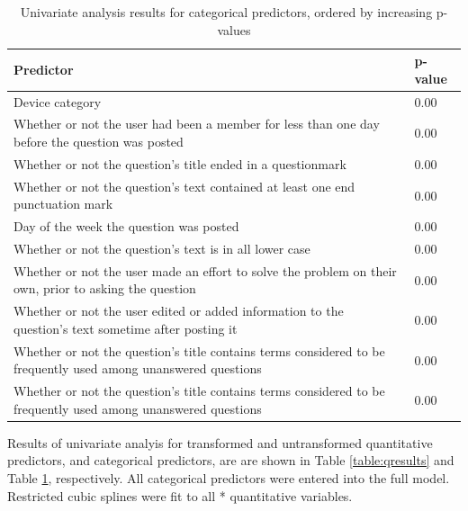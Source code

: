 \documentclass{article}
\begin{document}
\begin{table}[ht]
\centering
\caption{Univariate analysis results for categorical predictors, ordered by increasing p-values} 
\begin{tabular}{|p{12cm}|p{2cm}|}
  \hline
 Predictor & p-value \\ 
  \hline \hline
  Device category & 0.00 \\
  \hline
  Whether or not the user had been a member for less than one day before the question was posted & 0.00 \\ 
  \hline
  Whether or not the question's title ended in a questionmark & 0.00 \\ 
  \hline
  Whether or not the question's text contained at least one end punctuation mark & 0.00 \\ 
  \hline
  Day of the week the question was posted & 0.00 \\ 
  \hline
  Whether or not the question's text is in all lower case & 0.00 \\ 
  \hline
  Whether or not the user made an effort to solve the problem on their own, prior to asking the question & 0.00 \\ 
  \hline
  Whether or not the user edited or added information to the question's text sometime after posting it & 0.00 \\
  \hline
  Whether or not the question's title contains terms considered to be frequently used among unanswered questions & 0.00 \\ 
  \hline
  Whether or not the question's title contains terms considered to be frequently used among unanswered questions & 0.00 \\ 
   \hline
\end{tabular}
\label{table:cresults}
\end{table}

Results of univariate analyis for transformed and untransformed quantitative predictors, and categorical predictors, are are shown in Table \ref{table:qresults} and Table \ref{table:cresults}, respectively. All categorical predictors were entered into the full model. Restricted cubic splines were fit to all * quantitative variables.
\end{document}
